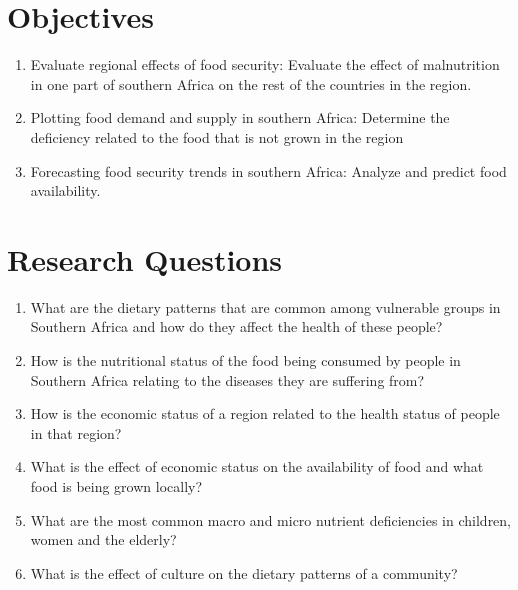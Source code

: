 \documentclass[a4paper,11pt]{report}
\begin{document}
	\section{Objectives}
	\begin{enumerate}
		\item Evaluate regional effects of food security: Evaluate the effect of malnutrition in one part of southern Africa on the rest of the countries in the region.
		\item Plotting food demand and supply in southern Africa: Determine the deficiency related to the food that is not grown in the region
		\item Forecasting food security trends in southern Africa: Analyze and predict food availability.
		\end {enumerate}
	
	\section{Research Questions}
	\begin{enumerate}
		\item What are the dietary patterns that are common among vulnerable groups in Southern Africa and how do they affect the health of these people?
		\item How is the nutritional status of the food being consumed by people in Southern Africa relating to the diseases they are suffering from?
		\item How is the economic status of a region related to the health status of people in that region?
		\item What is the effect of economic status on the availability of food and what food is being grown locally? 
		\item What are the most common macro and micro nutrient deficiencies in children, women and the elderly?
		\item What is the effect of culture on the dietary patterns of a community?
		
	\end{enumerate}
	
\end{document}
